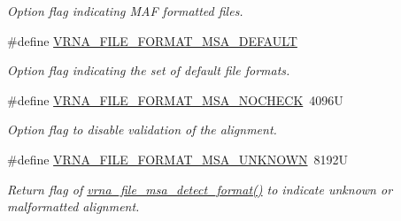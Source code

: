 \begin{DoxyCompactItemize}
\begin{DoxyCompactList}\small\item\em Option flag indicating M\+AF formatted files. \end{DoxyCompactList}\item 
\#define \hyperlink{group__file__utils_ga4acc255373831856a8417b68de8a94c0}{V\+R\+N\+A\+\_\+\+F\+I\+L\+E\+\_\+\+F\+O\+R\+M\+A\+T\+\_\+\+M\+S\+A\+\_\+\+D\+E\+F\+A\+U\+LT}
\begin{DoxyCompactList}\small\item\em Option flag indicating the set of default file formats. \end{DoxyCompactList}\item 
\#define \hyperlink{group__file__utils_ga229fb3778ecabea4782902b69fa48fd1}{V\+R\+N\+A\+\_\+\+F\+I\+L\+E\+\_\+\+F\+O\+R\+M\+A\+T\+\_\+\+M\+S\+A\+\_\+\+N\+O\+C\+H\+E\+CK}~4096U
\begin{DoxyCompactList}\small\item\em Option flag to disable validation of the alignment. \end{DoxyCompactList}\item 
\#define \hyperlink{group__file__utils_gabdc948f547e550125de3e7c65878400c}{V\+R\+N\+A\+\_\+\+F\+I\+L\+E\+\_\+\+F\+O\+R\+M\+A\+T\+\_\+\+M\+S\+A\+\_\+\+U\+N\+K\+N\+O\+WN}~8192U
\begin{DoxyCompactList}\small\item\em Return flag of \hyperlink{group__file__utils_gade4fa8136ebb2d0f7eb3f8b59a8658e3}{vrna\+\_\+file\+\_\+msa\+\_\+detect\+\_\+format()} to indicate unknown or malformatted alignment. \end{DoxyCompactList}\end{DoxyCompactItemize}
